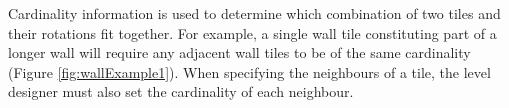 Cardinality information is used to determine which combination of two tiles and their rotations fit together. For example, a single wall tile constituting part of a longer wall will require any adjacent wall tiles to be of the same cardinality (Figure \ref{fig:wallExample1}). When specifying the neighbours of a tile, the level designer must also set the cardinality of each neighbour.

\begin{figure}[H]
    \centering

    \vspace{\baselineskip} %


\end{figure}
